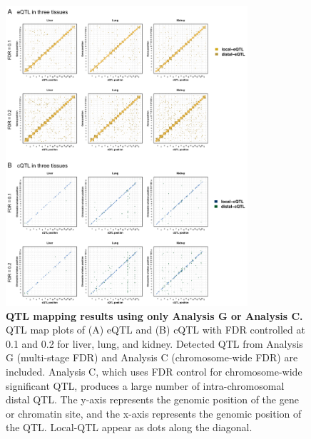 \documentclass[10pt,letterpaper,twoside]{article}
\begin{document}
\clearpage

\begin{figure}[hp]
\renewcommand{\familydefault}{\sfdefault}\normalfont
\centering
\includegraphics[width=0.8\textwidth, trim={0in 0in 0in 0in}, clip]{figs/qtl_map_supplemental.png}
\caption{\textbf{QTL mapping results using only Analysis G or Analysis C.} 
QTL map plots of (A) eQTL and (B) cQTL with FDR controlled at 0.1 and 0.2 for liver, lung, and kidney. Detected QTL from Analysis G (multi-stage FDR) and Analysis C (chromosome-wide FDR) are included. Analysis C, which uses FDR control for chromosome-wide significant QTL, produces a large number of intra-chromosomal distal QTL. The y-axis represents the genomic position of the gene or chromatin site, and the x-axis represents the genomic position of the QTL. Local-QTL appear as dots along the diagonal.
\label{fig:grid_fdr_plot}}
\end{figure}

\clearpage
\end{document}
